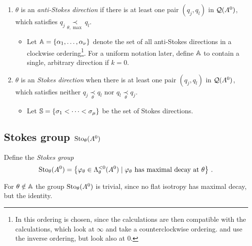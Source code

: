 \begin{defn}
  \label{defn:antiStokesDir}
  \begin{enumerate}
    \item $\theta$ is an \emph{anti-Stokes direction} if there is at least one
      pair $(q_j,q_l)$ in $\cQ(A^0)$, which satisfies
      $q_j \underset{\theta,\max}{\prec} q_l$.
      \begin{itemize}
        \item Let $\A=\{\alpha_1,\dots,\alpha_{\nu}\}$ denote the set of all
          anti-Stokes directions in a clockwise ordering\footnote{In
          \cite{Loday1994} this ordering is chosen, since the calculations are
          then compatible with the calculations, which look at $\infty$ and take
          a counterclockwise ordering. \cite{boalch} and \cite{thboalch} use the
          inverse ordering, but look also at $0$.}. For a uniform notation
          later, define $\A$ to contain a single, arbitrary direction if $k=0$.
      \end{itemize}
    \item $\theta$ is an \emph{Stokes direction} when there is at least one
      pair $(q_j,q_l)$ in $\cQ(A^0)$, which satisfies neither
      $q_j\underset{\theta}{\prec} q_l$ nor $q_l\underset{\theta}{\prec} q_j$.
      \begin{itemize}
        \item Let $\S=\{\sigma_1<\cdots<\sigma_\mu\}$ be the set of Stokes
          directions.
      \end{itemize}
  \end{enumerate}
\end{defn}

\begin{comment}
  In the case with only one level, the stokes directions are rotational
  symetric.
  \\The stokes direction, beared by level $k$ have the rotational symmetry.
\end{comment}

\subsection{Stokes group $\Sto_\theta(A^0)$}
\begin{defn}
  Define the \emph{Stokes group}
  \[
    \Sto_\theta(A^0)=
    \left\{\phi_\theta\in\Lambda_\theta^{<0}(A^0)
      \mid \phi_\theta \text{ has maximal decay at } \theta
    \right\} \,.
  \]
  \begin{s-rem}
    For $\theta\notin\A$ the group $\Sto_\theta(A^0)$ is trivial, since no flat
    isotropy has maximal decay, but the identity.
  \end{s-rem}
\end{defn}

